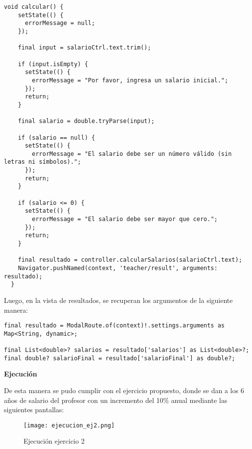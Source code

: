 \begin{center}
\begin{lstlisting}
void calcular() {
    setState(() {
      errorMessage = null;
    });

    final input = salarioCtrl.text.trim();

    if (input.isEmpty) {
      setState(() {
        errorMessage = "Por favor, ingresa un salario inicial.";
      });
      return;
    }

    final salario = double.tryParse(input);

    if (salario == null) {
      setState(() {
        errorMessage = "El salario debe ser un número válido (sin letras ni símbolos).";
      });
      return;
    }

    if (salario <= 0) {
      setState(() {
        errorMessage = "El salario debe ser mayor que cero.";
      });
      return;
    }

    final resultado = controller.calcularSalarios(salarioCtrl.text);
    Navigator.pushNamed(context, 'teacher/result', arguments: resultado);
  }
\end{lstlisting}
\end{center}

Luego, en la vista de resultados, se recuperan los argumentos de la siguiente manera:

\begin{center}
\begin{lstlisting}
final resultado = ModalRoute.of(context)!.settings.arguments as Map<String, dynamic>;

final List<double>? salarios = resultado['salarios'] as List<double>?;
final double? salarioFinal = resultado['salarioFinal'] as double?;
\end{lstlisting}
\end{center}

\textbf{Ejecución}

De esta manera se pudo cumplir con el ejercicio propuesto, donde se dan a los 6 años de salario del profesor con un incremento del 10\% anual mediante las siguientes pantallas:

\begin{figure}[H]
    \centering
    \texttt{[image: ejecucion\_ej2.png]}
    \caption{Ejecución ejercicio 2}
    \label{fig:ej2_ejecucion}
\end{figure}
